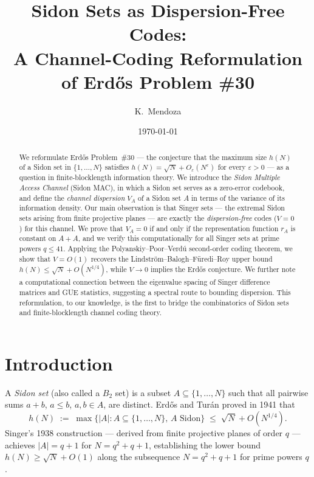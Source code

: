 \documentclass[12pt]{amsart}
\title{Sidon Sets as Dispersion-Free Codes:\\
A Channel-Coding Reformulation of Erd\H{o}s Problem \#30}
\author{K.\ Mendoza}
\date{\today}
\newcommand{\eps}{\varepsilon}
\newcommand{\hN}{h(N)}
\begin{document}
\begin{abstract}
We reformulate Erd\H{o}s Problem~\#30 --- the conjecture that the maximum size
$\hN$ of a Sidon set in $\{1,\ldots,N\}$ satisfies $\hN = \sqrt{N} +
O_\eps(N^\eps)$ for every $\eps>0$ --- as a question in finite-blocklength
information theory.  We introduce the \emph{Sidon Multiple Access Channel}
(Sidon MAC), in which a Sidon set serves as a zero-error codebook, and define
the \emph{channel dispersion} $V_A$ of a Sidon set $A$ in terms of the
variance of its information density.  Our main observation is that Singer
sets --- the extremal Sidon sets arising from finite projective planes --- are
exactly the \emph{dispersion-free} codes ($V = 0$) for this channel.  We prove
that $V_A = 0$ if and only if the representation function $r_A$ is constant on
$A + A$, and we verify this computationally for all Singer sets at prime powers
$q \le 41$.  Applying the Polyanskiy--Poor--Verd\'{u} second-order coding
theorem, we show that $V = O(1)$ recovers the Lindstr\"{o}m--Balogh--F\"{u}redi--Roy
upper bound $h(N) \le \sqrt{N} + O(N^{1/4})$, while $V \to 0$ implies the
Erd\H{o}s conjecture.  We further note a computational connection between the
eigenvalue spacing of Singer difference matrices and GUE statistics, suggesting
a spectral route to bounding dispersion.  This reformulation, to our knowledge,
is the first to bridge the combinatorics of Sidon sets and finite-blocklength
channel coding theory.
\end{abstract}

\maketitle

\section{Introduction}
\label{sec:intro}

A \emph{Sidon set} (also called a $B_2$ set) is a subset $A \subseteq
\{1,\ldots,N\}$ such that all pairwise sums $a + b$, $a \le b$, $a, b \in A$,
are distinct.  Erd\H{o}s and Tur\'{a}n \cite{ET41} proved in 1941 that
\[
   h(N) \;:=\; \max\bigl\{|A| : A \subseteq \{1,\ldots,N\},\, A \text{ Sidon}\bigr\}
   \;\le\; \sqrt{N} + O(N^{1/4}).
\]
Singer's 1938 construction \cite{Singer38} --- derived from finite projective
planes of order $q$ --- achieves $|A| = q + 1$ for $N = q^2 + q + 1$,
establishing the lower bound $h(N) \ge \sqrt{N} + O(1)$ along the subsequence
$N = q^2 + q + 1$ for prime powers $q$.
\end{document}
